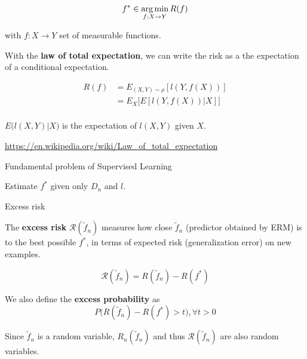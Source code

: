 \documentclass[
10pt, %
a4paper, %
oneside, %
headinclude,footinclude, %
BCOR5mm, %
]{scrartcl}
\begin{document}
\begin{equation}
    f^*\in \operatorname*{arg\,min}_{f:X\rightarrow Y} R(f)
\end{equation}

with $f:X\rightarrow Y$ set of measurable functions.

\begin{remark}
    With the \textbf{{law of total expectation}}, we can write the risk as a the
    expectation of a conditional expectation.

    \begin{equation}
        \begin{aligned}
            \label{eq:}
            R(f) &= E_{(X,Y)\sim \rho}[l(Y,f(X))]\\
            &= E_{X}\Big[E[l(Y,f(X))|X]\Big]\\
        \end{aligned}
    \end{equation}

    $E\big(l(X,Y)|X \big) $ is the expectation of $l(X, Y)$ given $X$.

    \url{https://en.wikipedia.org/wiki/Law_of_total_expectation} 
\end{remark}


\begin{definition}{Fundamental problem of Supervised Learning}

    Estimate $f^*$ given only $D_n$ and $l$.
    
\end{definition}

\begin{definition}{Excess risk}

    The \textbf{{excess risk}} $ \mathcal{R} ( \tilde{f}_n)$ measures how close  $ \tilde{f}_n$ (predictor obtained by ERM) is to the best possible $f^*$, in terms of expected risk (generalization error) on new examples.

    \begin{equation}
	\mathcal{R} ( \tilde{f}_n) = R( \tilde{f}_n)-R(f^*)
    \end{equation}

    We also define the \textbf{{excess probability}} as
    \begin{equation*}
	P\big( R( \tilde{f}_n)-R(f^*)>t\big), \forall t>0
    \end{equation*}
\end{definition}

\begin{remark}
Since $ \tilde{f}_n$ is a random variable, $R_n( \tilde{f}_n)$ and thus $ \mathcal{R} (\tilde{f}_n)$ are also random variables.
\end{remark}
\end{document}
